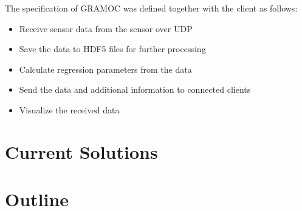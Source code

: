 The specification of GRAMOC was defined together with the client as follows:

\begin{itemize}
    \item Receive sensor data from the sensor over UDP
    \item Save the data to HDF5 files for further processing
    \item Calculate regression parameters from the data
    \item Send the data and additional information to connected clients
    \item Visualize the received data
\end{itemize}

\section{Current Solutions}



\section{Outline}



